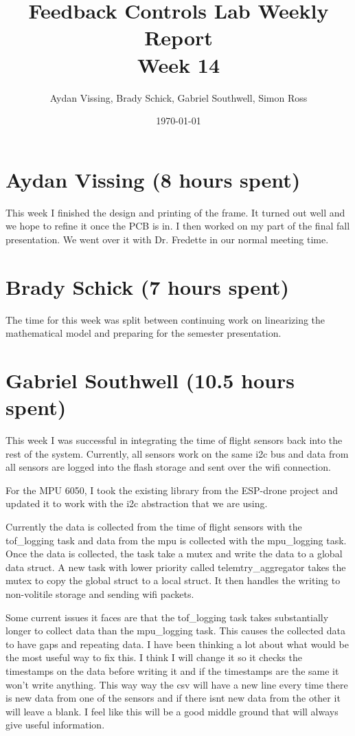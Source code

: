 \documentclass[12pt, titlepage]{article}
\title{Feedback Controls Lab Weekly Report \\ \normalsize{Week 14}}
\author{Aydan Vissing, Brady Schick, Gabriel Southwell, Simon Ross}
\date{\today}
\begin{document}
\maketitle

\section*{Aydan Vissing (8 hours spent)}

This week I finished the design and printing of the frame. It turned out well and we hope to refine it once the PCB is in. I then worked on my part of the final fall presentation. We went over it with Dr. Fredette in our normal meeting time. 

\section*{Brady Schick (7 hours spent)}

The time for this week was split between continuing work on linearizing the mathematical model and preparing for the semester presentation. 

\section*{Gabriel Southwell (10.5 hours spent)}

This week I was successful in integrating the time of flight sensors back into the rest of the system. Currently, all sensors work on the same i2c bus and data from all sensors are logged into the flash storage and sent over the wifi connection. 

For the MPU 6050, I took the existing library from the ESP-drone project and updated it to work with the i2c abstraction that we are using. 

Currently the data is collected from the time of flight sensors with the tof\_logging task and data from the mpu is collected with the mpu\_logging task. Once the data is collected, the task take a mutex and write the data to a global data struct. A new task with lower priority called telemtry\_aggregator takes the mutex to copy the global struct to a local struct. It then handles the writing to non-volitile storage and sending wifi packets. 

Some current issues it faces are that the tof\_logging task takes substantially longer to collect data than the mpu\_logging task. This causes the collected data to have gaps and repeating data. I have been thinking a lot about what would be the most useful way to fix this. I think I will change it so it checks the timestamps on the data before writing it and if the timestamps are the same it won't write anything. This way way the csv will have a new line every time there is new data from one of the sensors and if there isnt new data from the other it will leave a blank. I feel like this will be a good middle ground that will always give useful information.
 
\end{document}
